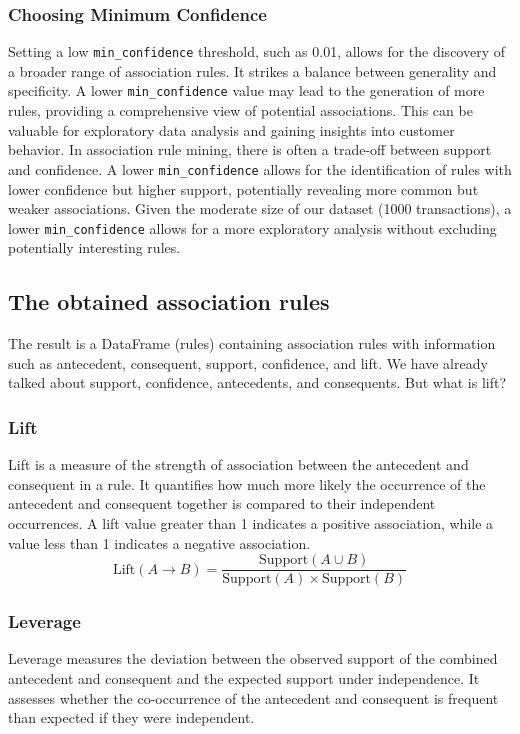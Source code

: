 \subsubsection{Choosing Minimum Confidence}
Setting a low \verb|min_confidence| threshold, such as 0.01, allows for the discovery of a broader range of association rules. It strikes a balance between generality and specificity. A lower \verb|min_confidence| value may lead to the generation of more rules, providing a comprehensive view of potential associations. This can be valuable for exploratory data analysis and gaining insights into customer behavior. In association rule mining, there is often a trade-off between support and confidence. A lower \verb|min_confidence| allows for the identification of rules with lower confidence but higher support, potentially revealing more common but weaker associations. Given the moderate size of our dataset (1000 transactions), a lower \verb|min_confidence| allows for a more exploratory analysis without excluding potentially interesting rules.

\subsection{The obtained association rules}
The result is a DataFrame (rules) containing association rules with information such as antecedent, consequent, support, confidence, and lift. We have already talked about support, confidence, antecedents, and consequents. But what is lift?
\subsubsection{Lift}
Lift is a measure of the strength of association between the antecedent and consequent in a rule. It quantifies how much more likely the occurrence of the antecedent and consequent together is compared to their independent occurrences. A lift value greater than 1 indicates a positive association, while a value less than 1 indicates a negative association.
\begin{equation}
\text{Lift}(A \rightarrow B) = \frac{\text{Support}(A \cup B)}{\text{Support}(A) \times \text{Support}(B)}
\end{equation}

\subsubsection{Leverage}
Leverage measures the deviation between the observed support of the combined antecedent and consequent and the expected support under independence. It assesses whether the co-occurrence of the antecedent and consequent is frequent than expected if they were independent.

